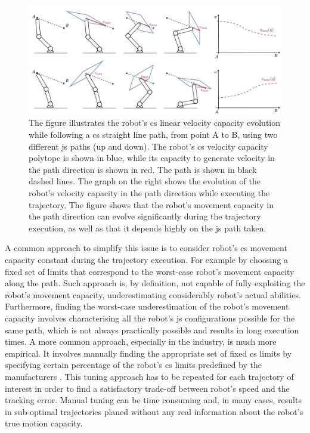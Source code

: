 \begin{figure}[!t]
    \centering 
    \includegraphics[width=\linewidth]{Papers/imgs/motivation_topca.pdf}
    \caption{The figure illustrates the robot's \gls{cs} linear velocity capacity evolution while following a \gls{cs} straight line path, from point A to B, using two different \gls{js} paths (up and down). The robot's \gls{cs} velocity capacity polytope is shown in blue, while its capacity to generate velocity in the path direction is shown in red. The path is shown in black dashed lines. The graph on the right shows the evolution of the robot's velocity capacity in the path direction while executing the trajectory. The figure shows that the robot's movement capacity in the path direction can evolve significantly during the trajectory execution, as well as that it depends highly on the \gls{js} path taken. }
    \label{fig:motiv_topca}
\end{figure}

A common approach to simplify this issue is to consider robot's \gls{cs} movement capacity constant during the trajectory execution. For example by choosing a fixed set of limits that correspond to the worst-case robot's movement capacity along the path. 
Such approach is, by definition, not capable of fully exploiting the robot's movement capacity, underestimating considerably robot's actual abilities. Furthermore, finding the worst-case underestimation of the robot's movement capacity involves characterising all the robot's \gls{js} configurations possible for the same path, which is not always practically possible and results in long execution times. 
A more common approach, especially in the industry, is much more empirical. It involves manually finding the appropriate set of fixed \gls{cs} limits by specifying certain percentage of the robot's \gls{cs} limits predefined by the manufacturers \cite{ur3data}\cite{frankadata}. 
This tuning approach has to be repeated for each trajectory of interest in order to find a satisfactory trade-off between robot's speed and the tracking error. Manual tuning can be time consuming and, in many cases, results in sub-optimal trajectories planed without any real information about the robot's true motion capacity. 

